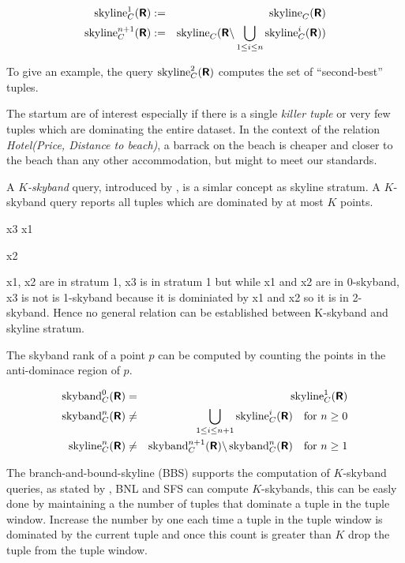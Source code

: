 \begin{eqnarray}
\skyline_C^1(\relation{R}) & := & \skyline_C(\relation{R}) \\
\skyline_C^{n+1}(\relation{R}) & := & \skyline_C(\relation{R} \difference \bigunion_{1 \le i \le n} \skyline_C^i(\relation{R}))
\end{eqnarray}

To give an example, the query $\skyline_C^2(\relation{R})$ computes the set of ``second-best'' tuples.

The startum are of interest especially if there is a single
\emph{killer tuple} or very few tuples which are dominating the entire
dataset.  In the context of the relation \emph{Hotel(Price, Distance
to beach)}, a barrack on the beach is cheaper and closer to the beach
than any other accommodation, but might to meet our
standards. 

A \emph{$K$-skyband} query, introduced by \citet{Papadias2005}, is a simlar concept as skyline stratum. A $K$-skyband query reports all tuples which are dominated by at most $K$ points.

        x3
  x1  
 
    x2

x1, x2 are in stratum 1, x3 is in stratum 1 but while x1 and x2 are in 0-skyband, x3 is not is 1-skyband because it is dominiated by x1 and x2 so it is in 2-skyband. Hence no general relation can be established between K-skyband and skyline stratum.

The skyband rank of a point $p$ can be computed by counting the points in the anti-dominace region of $p$.

\begin{eqnarray}
\skyband_C^0(\relation{R}) &=& \skyline_C^1(\relation{R}) \label{equ:skyband} \\
\skyband_C^n(\relation{R}) &\not=& \bigunion_{1 \le i \le n+1} \skyline_C^i(\relation{R}) \quad \textnormal{for}\ n \ge 0\label{equ:skybandgeneral} \\
\skyline_C^n(\relation{R}) &\not=& \skyband_C^{n+1}(\relation{R}) \difference \skyband_C^n(\relation{R}) \quad \textnormal{for}\ n \ge 1
\end{eqnarray}

The branch-and-bound-skyline (BBS) \citep{Papadias2005} supports the computation of $K$-skyband queries, as stated by \citet{Papadias2005}, BNL and SFS can compute $K$-skybands, this can be easly done by maintaining a the number of tuples that dominate a tuple in the tuple window. Increase the number by one each time a tuple in the tuple window is dominated by the current tuple and once this count is greater than $K$ drop the tuple from the tuple window.


